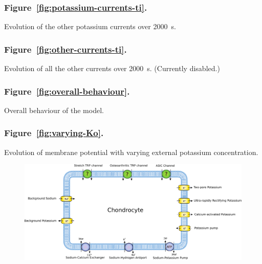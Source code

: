 \subsubsection*{Figure~\ref{fig:potassium-currents-ti}.}
Evolution of the other potassium currents over 2000~s.

\subsubsection*{Figure~\ref{fig:other-currents-ti}.}
Evolution of all the other currents over 2000~s. (Currently disabled.)

\subsubsection*{Figure~\ref{fig:overall-behaviour}.}
Overall behaviour of the model.

\subsubsection*{Figure~\ref{fig:varying-Ko}.}
Evolution of membrane potential with varying external potassium concentration.

\clearpage
\begin{figure}
  \centering
  \includegraphics[width=\textwidth]
  {../images/pdf/chondrocyte-model-cellml}
  \caption{}
  \label{fig:chondrocyte-model}
\end{figure}

